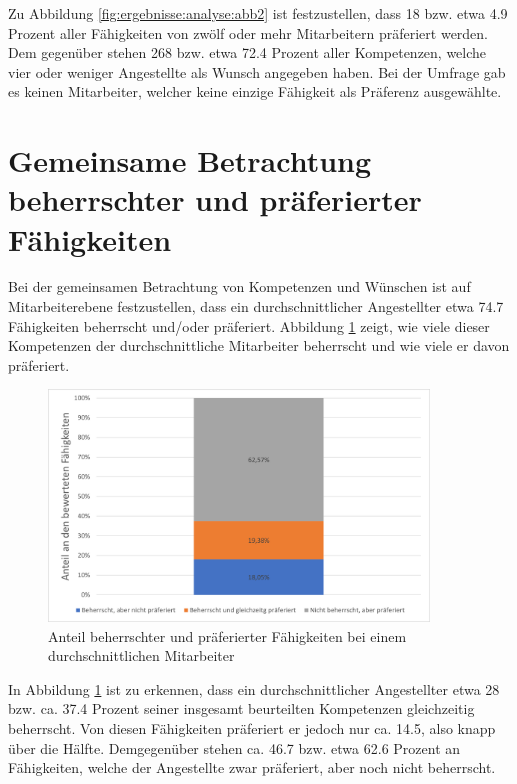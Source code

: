 Zu Abbildung \ref{fig:ergebnisse:analyse:abb2} ist festzustellen, dass 18 bzw. etwa 4.9 Prozent aller Fähigkeiten von zwölf oder mehr Mitarbeitern präferiert werden. Dem gegenüber stehen 268 bzw. etwa 72.4 Prozent aller Kompetenzen, welche vier oder weniger Angestellte als Wunsch angegeben haben. Bei der Umfrage gab es keinen Mitarbeiter, welcher keine einzige Fähigkeit als Präferenz ausgewählte.

\section{Gemeinsame Betrachtung beherrschter und präferierter Fähigkeiten}
\label{ch:ergebnisse:analyse3}
Bei der gemeinsamen Betrachtung von Kompetenzen und Wünschen ist auf Mitarbeiterebene festzustellen, dass ein durchschnittlicher Angestellter etwa 74.7 Fähigkeiten beherrscht und/oder präferiert. Abbildung \ref{fig:ergebnisse:analyse:abb3} zeigt, wie viele dieser Kompetenzen der durchschnittliche Mitarbeiter beherrscht und wie viele er davon präferiert.

\begin{figure}[h]
	\centering
	\includegraphics[width=0.9\textwidth]{gfx/auswertung-anteil-an-faehigkeiten.png}
	\caption{Anteil beherrschter und präferierter Fähigkeiten bei einem durchschnittlichen Mitarbeiter}
	\label{fig:ergebnisse:analyse:abb3}
\end{figure}

In Abbildung \ref{fig:ergebnisse:analyse:abb3} ist zu erkennen, dass ein durchschnittlicher Angestellter etwa 28 bzw. ca. 37.4 Prozent seiner insgesamt beurteilten Kompetenzen gleichzeitig beherrscht. Von diesen Fähigkeiten präferiert er jedoch nur ca. 14.5, also knapp über die Hälfte. Demgegenüber stehen ca. 46.7 bzw. etwa 62.6 Prozent an Fähigkeiten, welche der Angestellte zwar präferiert, aber noch nicht beherrscht.

